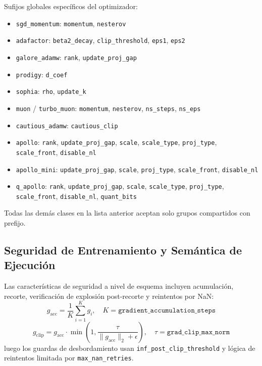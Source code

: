 \documentclass[11pt,a4paper]{article}
\begin{document}
Sufijos globales específicos del optimizador:
\begin{itemize}[leftmargin=*]
    \item \texttt{sgd\_momentum}: \texttt{momentum}, \texttt{nesterov}
    \item \texttt{adafactor}: \texttt{beta2\_decay}, \texttt{clip\_threshold}, \texttt{eps1}, \texttt{eps2}
    \item \texttt{galore\_adamw}: \texttt{rank}, \texttt{update\_proj\_gap}
    \item \texttt{prodigy}: \texttt{d\_coef}
    \item \texttt{sophia}: \texttt{rho}, \texttt{update\_k}
    \item \texttt{muon} / \texttt{turbo\_muon}: \texttt{momentum}, \texttt{nesterov}, \texttt{ns\_steps}, \texttt{ns\_eps}
    \item \texttt{cautious\_adamw}: \texttt{cautious\_clip}
    \item \texttt{apollo}: \texttt{rank}, \texttt{update\_proj\_gap}, \texttt{scale}, \texttt{scale\_type}, \texttt{proj\_type}, \texttt{scale\_front}, \texttt{disable\_nl}
    \item \texttt{apollo\_mini}: \texttt{update\_proj\_gap}, \texttt{scale}, \texttt{proj\_type}, \texttt{scale\_front}, \texttt{disable\_nl}
    \item \texttt{q\_apollo}: \texttt{rank}, \texttt{update\_proj\_gap}, \texttt{scale}, \texttt{scale\_type}, \texttt{proj\_type}, \texttt{scale\_front}, \texttt{disable\_nl}, \texttt{quant\_bits}
\end{itemize}
Todas las demás clases en la lista anterior aceptan solo grupos compartidos con prefijo.

\subsection{Seguridad de Entrenamiento y Semántica de Ejecución}

Las características de seguridad a nivel de esquema incluyen acumulación, recorte, verificación de explosión post-recorte y reintentos por NaN:
\[
g_{\text{acc}}=\frac{1}{K}\sum_{i=1}^{K} g_i,\quad K=\texttt{gradient\_accumulation\_steps}
\]
\[
g_{\text{clip}} = g_{\text{acc}}\cdot
\min\left(1,\frac{\tau}{\|g_{\text{acc}}\|_2+\epsilon}\right),\quad
\tau=\texttt{grad\_clip\_max\_norm}
\]
luego los guardas de desbordamiento usan \texttt{inf\_post\_clip\_threshold} y lógica de reintentos limitada por \texttt{max\_nan\_retries}.
\end{document}

